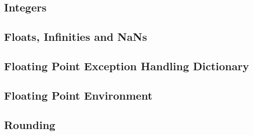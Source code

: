 \documentclass[../../CDR-IEEE-754-support.tex]{subfiles}
\begin{document}
\subsection{Integers}

\newpage

\subsection{Floats, Infinities and NaNs}

\newpage

\subsection{Floating Point Exception Handling Dictionary}

\newpage

\subsection{Floating Point Environment}

\newpage

\subsection{Rounding}

\end{document}
